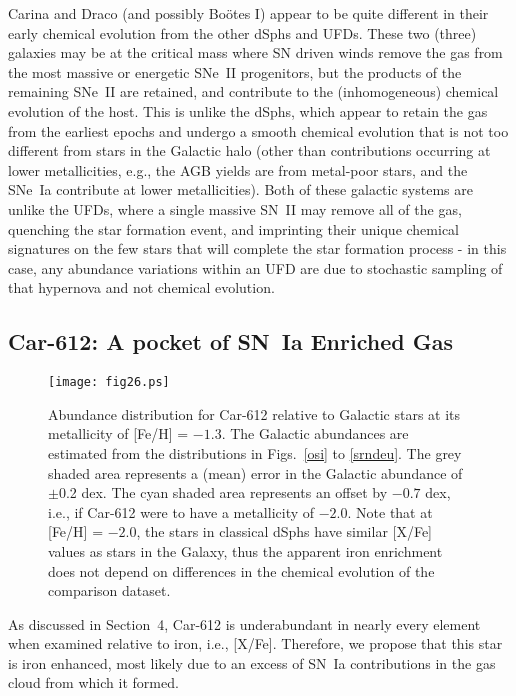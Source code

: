 \documentclass{emulateapj}
\begin{document}
Carina and Draco (and possibly Bo\"otes I) appear to be quite different in their
early chemical evolution from the other dSphs and UFDs.    These two (three) 
galaxies may be at the critical mass where SN driven winds remove the gas 
from the most massive or energetic SNe~II progenitors, but the products of 
the remaining SNe~II are retained, and contribute to the 
(inhomogeneous) chemical evolution of the host.    
This is unlike the dSphs, which appear to retain the gas from the earliest 
epochs and undergo a smooth chemical evolution  that is not too different
from stars in the Galactic halo (other than contributions occurring at lower
metallicities, e.g., the AGB yields are from metal-poor stars, and the SNe~Ia
contribute at lower metallicities).  Both of these galactic systems are 
unlike the UFDs, where a single massive SN~II may remove all of the gas, 
quenching the star formation event, and imprinting their unique chemical 
signatures on the few stars that will complete the star formation process 
- in this case, any abundance variations within an UFD are due to stochastic 
sampling of that hypernova and not chemical evolution. 



\subsection {Car-612: A pocket of SN~Ia Enriched Gas}


\begin{figure}[b]
\begin{center}
\texttt{[image: fig26.ps]}
\caption{Abundance distribution for Car-612 relative to Galactic stars at 
its metallicity of [Fe/H] = $-1.3$.  The Galactic abundances are estimated 
from the distributions in Figs.~\ref{osi} to \ref{srndeu}.  
The grey shaded area represents a (mean) error in 
the Galactic abundance of $\pm$0.2 dex.  The cyan shaded area  represents an
offset by $-0.7$ dex, i.e., if Car-612 were to have a metallicity of $-2.0$.
%
Note that at [Fe/H] = $-2.0$, the stars in classical dSphs 
have similar [X/Fe] values as stars in the Galaxy, thus the
apparent iron enrichment does not depend on differences in 
the chemical evolution of the comparison dataset.
}
\label{a612}
\end{center}
\end{figure}


As discussed in Section~4, Car-612 is underabundant in nearly 
every element when examined relative to iron, i.e., [X/Fe].    
Therefore, we propose that this star is iron enhanced, most 
likely due to an excess of SN~Ia 
contributions in the gas cloud from which it formed.  
\end{document}
